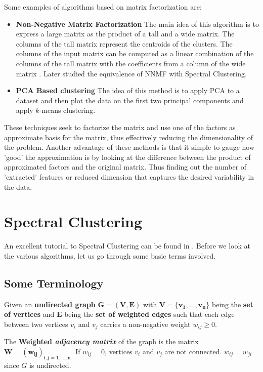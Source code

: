 \documentclass[10pt,a4paper, nocenter]{report}
\begin{document}
    Some examples of algorithms based on matrix factorization are:
    \begin{itemize}
        \item \textbf{Non-Negative Matrix Factorization} The main idea of this algorithm is to express a large matrix as the product of a tall and a wide matrix. The columns of the tall matrix represent the centroids of the clusters. The columns of the input matrix can be computed as a linear combination of the columns of the tall matrix with the coefficients from a column of the wide matrix \cite{Lawton-1971-nnmf} \cite{Paatero1991-nnmf}. Later \cite{Ding05-nnmf-spectral} studied the equivalence of NNMF with Spectral Clustering.
        \item \textbf{PCA Based clustering} The idea of this method is to apply PCA to a dataset and then plot the data on the first two principal components and apply $k$-means clustering. \cite{Zhang-2108-pca} 
    \end{itemize}

        These techniques seek to factorize the matrix and use one of the factors as approximate basis for the matrix, thus effectively reducing the dimensionality of the problem. Another advantage of these methods is that it simple to gauge how 'good' the approximation is by looking at the difference between the product of approximated factors and the original matrix. Thus finding out the number of 'extracted' features or reduced dimension that captures the desired variability in the data. 


    \chapter{Spectral Clustering}
    An excellent tutorial to Spectral Clustering can be found in \cite{Luxburg2007}. Before we look at the various algorithms, let us go through some basic terms involved.

    \section{Some Terminology}

        Given an \textbf{undirected graph} $\mathbf{G=(V,E)}$ with $\mathbf{V=\{v_{1},\dots,v_{n}\}}$ being the \textbf{set of vertices} and $\mathbf{E}$ being the \textbf{set of weighted edges} such that each edge between two vertices $v_{i}$ and $v_{j}$ carries a non-negative weight $w_{ij} \ge 0$.

        The \textbf{Weighted \textit{adjacency matrix}} of the graph is the matrix $\mathbf{W=(w_{ij})_{i,j=1,\dots,n}}$. If $w_{ij}=0$, vertices $v_{i}$ and $v_{j}$ are not connected. $w_{ij}=w_{ji}$ since $G$ is undirected. 
\end{document}
